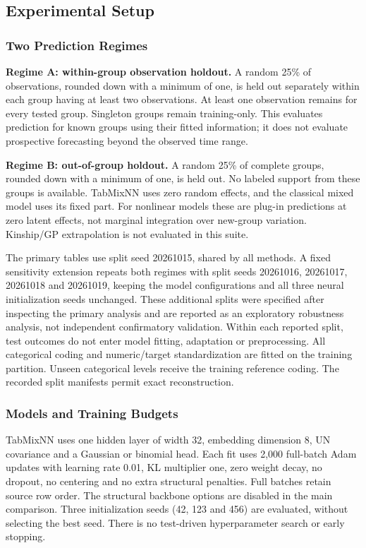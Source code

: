 \subsection{Experimental Setup}

\subsubsection{Two Prediction Regimes}

\textbf{Regime A: within-group observation holdout.} A random 25\% of observations, rounded down with a minimum of one, is held out separately within each group having at least two observations. At least one observation remains for every tested group. Singleton groups remain training-only. This evaluates prediction for known groups using their fitted information; it does not evaluate prospective forecasting beyond the observed time range.

\textbf{Regime B: out-of-group holdout.} A random 25\% of complete groups, rounded down with a minimum of one, is held out. No labeled support from these groups is available. TabMixNN uses zero random effects, and the classical mixed model uses its fixed part. For nonlinear models these are plug-in predictions at zero latent effects, not marginal integration over new-group variation. Kinship/GP extrapolation is not evaluated in this suite.

The primary tables use split seed 20261015, shared by all methods. A fixed sensitivity extension repeats both regimes with split seeds 20261016, 20261017, 20261018 and 20261019, keeping the model configurations and all three neural initialization seeds unchanged. These additional splits were specified after inspecting the primary analysis and are reported as an exploratory robustness analysis, not independent confirmatory validation. Within each reported split, test outcomes do not enter model fitting, adaptation or preprocessing. All categorical coding and numeric/target standardization are fitted on the training partition. Unseen categorical levels receive the training reference coding. The recorded split manifests permit exact reconstruction.

\subsubsection{Models and Training Budgets}

TabMixNN uses one hidden layer of width 32, embedding dimension 8, UN covariance and a Gaussian or binomial head. Each fit uses 2,000 full-batch Adam updates with learning rate 0.01, KL multiplier one, zero weight decay, no dropout, no centering and no extra structural penalties. Full batches retain source row order. The structural backbone options are disabled in the main comparison. Three initialization seeds (42, 123 and 456) are evaluated, without selecting the best seed. There is no test-driven hyperparameter search or early stopping.

